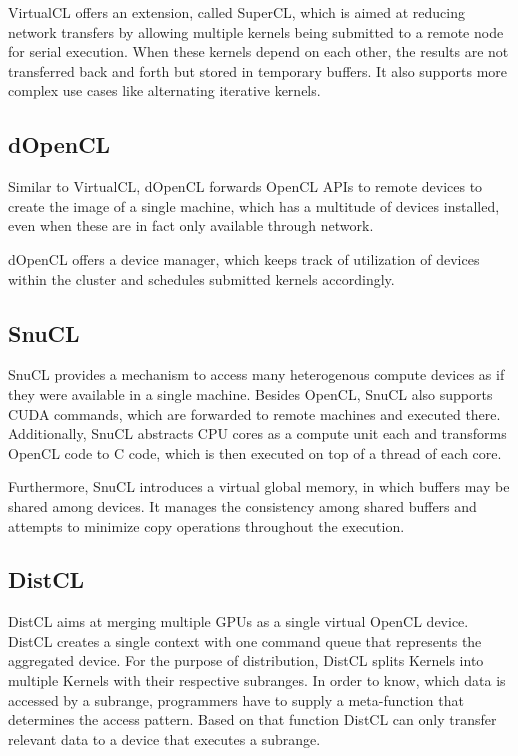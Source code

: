 VirtualCL offers an extension, called SuperCL, which is aimed at reducing network transfers by allowing multiple kernels being submitted to a remote node for serial execution. When these kernels depend on each other, the results are not transferred back and forth but stored in temporary buffers. It also supports more complex use cases like alternating iterative kernels.

\subsection{dOpenCL\cite{dopencl}}

Similar to VirtualCL, dOpenCL forwards OpenCL APIs to remote devices to create the image of a single machine, which has a multitude of devices installed, even when these are in fact only available through network.

dOpenCL offers a device manager, which keeps track of utilization of devices within the cluster and schedules submitted kernels accordingly.

\subsection{SnuCL\cite{snucl}}

SnuCL provides a mechanism to access many heterogenous compute devices as if they were available in a single machine. Besides OpenCL, SnuCL also supports CUDA commands, which are forwarded to remote machines and executed there. Additionally, SnuCL abstracts CPU cores as a compute unit each and transforms OpenCL code to C code, which is then executed on top of a thread of each core.

Furthermore, SnuCL introduces a virtual global memory, in which buffers may be shared among devices. It manages the consistency among shared buffers and attempts to minimize copy operations throughout the execution.

\subsection{DistCL\cite{distcl}}
DistCL aims at merging multiple GPUs as a single virtual OpenCL device. DistCL creates a single context with one command queue that represents the aggregated device. For the purpose of distribution, DistCL splits Kernels into multiple Kernels with their respective subranges. In order to know, which data is accessed by a subrange, programmers have to supply a meta-function that determines the access pattern. Based on that function DistCL can only transfer relevant data to a device that executes a subrange.


